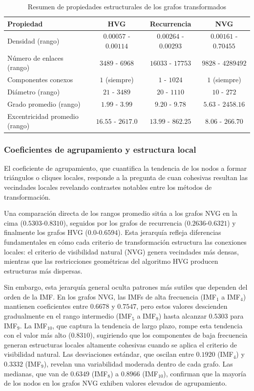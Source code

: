 \documentclass[11pt,a4paper]{article}
\begin{document}
\begin{table}[h]
\centering
\caption{Resumen de propiedades estructurales de los grafos transformados}
\label{tab:propiedades_estructurales}
\small
\begin{tabular}{lccc}
\toprule
\textbf{Propiedad} & \textbf{HVG} & \textbf{Recurrencia} & \textbf{NVG} \\
\midrule
Densidad (rango) & $0.00057$ - $0.00114$ & $0.00264$ - $0.00293$ & $0.00161$ - $0.70455$ \\
Número de enlaces (rango) & $3489$ - $6968$ & $16033$ - $17753$ & $9828$ - $4289492$ \\
Componentes conexos & $1$ (siempre) & $1$ - $1024$ & $1$ (siempre) \\
Diámetro (rango) & $21$ - $3489$ & $20$ - $1110$ & $10$ - $272$ \\
Grado promedio (rango) & $1.99$ - $3.99$ & $9.20$ - $9.78$ & $5.63$ - $2458.16$ \\
Excentricidad promedio (rango) & $16.55$ - $2617.0$ & $13.99$ - $862.25$ & $8.06$ - $266.70$ \\
\bottomrule
\end{tabular}
\end{table}

\subsubsection{Coeficientes de agrupamiento y estructura local}

El coeficiente de agrupamiento, que cuantifica la tendencia de los nodos a formar triángulos o cliques locales, responde a la pregunta de cuan cohesivas resultan las vecindades locales revelando contrastes notables entre los métodos de transformación.

Una comparación directa de los rangos promedio sitúa a los grafos NVG en la cima ($0.5303$-$0.8310$), seguidos por los grafos de recurrencia ($0.2636$-$0.6321$) y finalmente los grafos HVG ($0.0$-$0.6594$). Esta jerarquía refleja diferencias fundamentales en cómo cada criterio de transformación estructura las conexiones locales: el criterio de visibilidad natural (NVG) genera vecindades más densas, mientras que las restricciones geométricas del algoritmo HVG producen estructuras más dispersas.

Sin embargo, esta jerarquía general oculta patrones más sutiles que dependen del orden de la IMF. En los grafos NVG, las IMFs de alta frecuencia (IMF$_1$ a IMF$_4$) mantienen coeficientes entre $0.6678$ y $0.7547$, pero estos valores descienden gradualmente en el rango intermedio (IMF$_5$ a IMF$_9$) hasta alcanzar $0.5303$ para IMF$_9$. La IMF$_{10}$, que captura la tendencia de largo plazo, rompe esta tendencia con el valor más alto ($0.8310$), sugiriendo que los componentes de baja frecuencia generan estructuras locales altamente cohesivas cuando se aplica el criterio de visibilidad natural. Las desviaciones estándar, que oscilan entre $0.1920$ (IMF$_4$) y $0.3332$ (IMF$_9$), revelan una variabilidad moderada dentro de cada grafo. Las medianas, que van de $0.6349$ (IMF$_8$) a $0.8966$ (IMF$_{10}$), confirman que la mayoría de los nodos en los grafos NVG exhiben valores elevados de agrupamiento.
\end{document}
